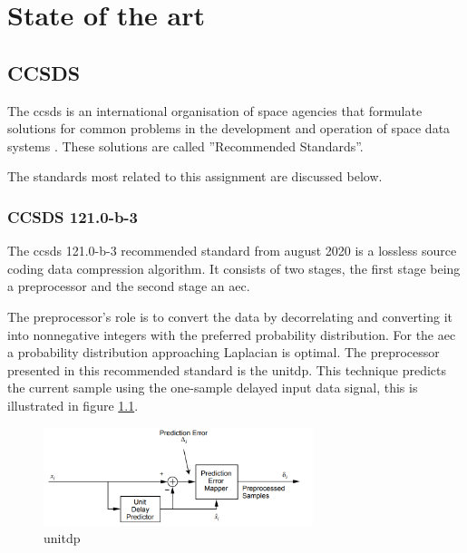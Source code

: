 




 
\chapter{State of the art}\label{ch:sota}

\section{CCSDS}
The \gls{ccsds} is an international organisation of space agencies that formulate solutions for common problems in the development and operation of space data systems \cite{noauthor_ccsdsorg_nodate-1}. These solutions are called ''Recommended Standards''. %

The standards most related to this assignment are discussed below.

\subsection{CCSDS 121.0-b-3}
The \gls{ccsds} 121.0-b-3 recommended standard from august 2020 \cite{ccsds_secretariat_lossless_2020} is a lossless source coding data compression algorithm. It consists of two stages, the first stage being a preprocessor and the second stage an \gls{aec}.

The preprocessor's role is to convert the data by decorrelating and converting it into nonnegative integers with the preferred probability distribution. For the \gls{aec} a probability distribution approaching Laplacian is optimal. The preprocessor presented in this recommended standard is the \gls{unitdp}. This technique predicts the current sample using the one-sample delayed input data signal, this is illustrated in figure \ref{fig:udp}. 
\begin{figure}[h]
    \centering
    \includegraphics[width=0.7\textwidth]{figs/unit_delay_predictor.png}
    \caption{\acrfull{unitdp} \cite{ccsds_secretariat_lossless_2020}}
    \label{fig:udp}
\end{figure}


